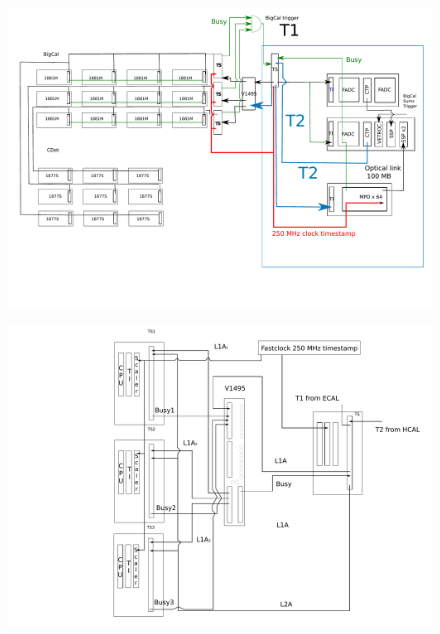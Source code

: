 \documentclass{article}
\begin{document}
\begin{figure}
\includegraphics[scale=0.55]{figs/SBSlayoutOld.pdf}\\
\end{figure}

\begin{figure}
\includegraphics[scale=0.55]{figs/TSs.pdf}\\
\end{figure}
\end{document}
